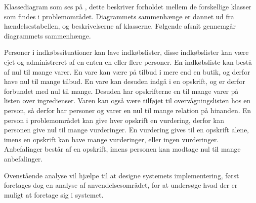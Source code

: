 Klassediagram som ses på , dette beskriver forholdet mellem de forskellige klasser som findes i problemområdet.
Diagrammets sammenhænge er dannet ud fra hændelsestabellen, og beskrivelserne af klasserne.
Følgende afsnit gennemgår diagrammets sammenhænge.

Personer i indkøbssituationer kan lave indkøbslister, disse indkøbslister kan være ejet og administreret af en enten en eller flere personer.
En indkøbsliste kan bestå af nul til mange varer.
En vare kan være på tilbud i mere end en butik, og derfor have nul til mange tilbud.
En vare kan desuden indgå i en opskrift, og er derfor forbundet med nul til mange.
Desuden har opskrifterne en til mange varer på listen over ingredienser.
Varen kan også være tilføjet til overvågningslisten hos en person, så derfor har personer og varer en nul til mange relation på hinanden.
En person i problemområdet kan give hver opskrift en vurdering, derfor kan personen give nul til mange vurderinger.
En vurdering gives til en opskrift alene, imens en opskrift kan have mange vurderinger, eller ingen vurderinger.
Anbefalinger består af en opskrift, imens personen kan modtage nul til mange anbefalinger.

Ovenstående analyse vil hjælpe til at designe systemets implementering, først foretages dog en analyse af anvendelsesområdet, for at undersøge hvad der er muligt at foretage sig i systemet.

